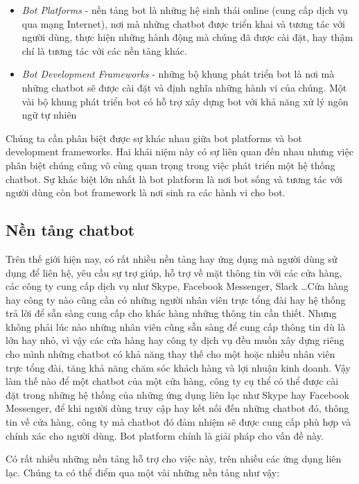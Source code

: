 \documentclass[12pt]{report}
\begin{document}
\begin{itemize}
	\item \textit{Bot Platforms} - nền tảng bot là những hệ sinh thái online (cung cấp dịch vụ qua mạng Internet), nơi mà những chatbot được triển khai và tương tác với người dùng, thực hiện những hành động mà chúng đã được cài đặt, hay thậm chí là tương tác với các nền tảng khác.
	\item \textit{Bot Development Frameworks} - những bộ khung phát triển bot là nơi mà những chatbot sẽ được cài đặt và định nghĩa những hành vi của chúng. Một vài bộ khung phát triển bot có hỗ trợ xây dựng bot với khả năng xử lý ngôn ngữ tự nhiên
\end{itemize}

Chúng ta cần phân biệt được sự khác nhau giữa bot platforms và bot development frameworks. Hai khái niệm này có sự liên quan đến nhau nhưng việc phân biệt chúng cũng vô cùng quan trọng trong việc phát triển một hệ thống chatbot. Sự khác biệt lớn nhất là bot platform là nơi bot sống và tương tác với người dùng còn bot framework là nơi sinh ra các hành vi cho bot.

\subsection{Nền tảng chatbot}

Trên thế giới hiện nay, có rất nhiều nền tảng hay ứng dụng mà người dùng sử dụng để liên hệ, yêu cầu sự trợ giúp, hỗ trợ về mặt thông tin với các cửa hàng, các công ty cung cấp dịch vụ như Skype, Facebook Messenger, Slack \ldots Cửa hàng hay công ty nào cũng cần có những người nhân viên trực tổng đài hay hệ thống trả lời để sẵn sàng cung cấp cho khác hàng những thông tin cần thiết. Nhưng không phải lúc nào những nhân viên cũng sẵn sàng để cung cấp thông tin dù là lớn hay nhỏ, vì vậy các cửa hàng hay công ty dịch vụ đều muốn xây dựng riêng cho mình những chatbot có khả năng thay thế cho một hoặc nhiều nhân viên trực tổng đài, tăng khả năng chăm sóc khách hàng và lợi nhuận kinh doanh. Vậy làm thế nào để một chatbot của một cửa hàng, công ty cụ thể có thể được cài đặt trong những hệ thống của những ứng dụng liên lạc như Skype hay Facebook Messenger, để khi người dùng truy cập hay kết nối đến những chatbot đó, thông tin về cửa hàng, công ty mà chatbot đó đảm nhiệm sẽ được cung cấp phù hợp và chính xác cho người dùng. Bot platform chính là giải pháp cho vấn đề này.

Có rất nhiều những nền tảng hỗ trợ cho việc này, trên nhiều các ứng dụng liên lạc. Chúng ta có thể điểm qua một vài những nền tảng như vậy:
\end{document}
